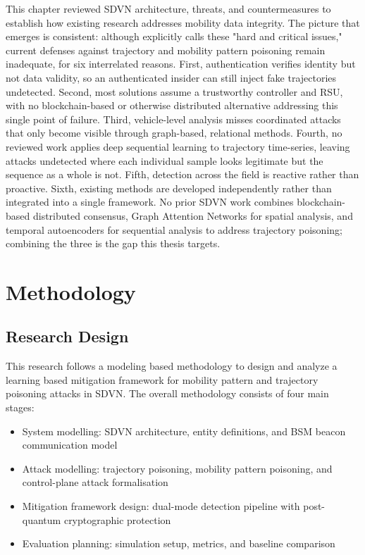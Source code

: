 \documentclass[12pt, a4paper]{report}
\begin{document}
This chapter reviewed SDVN architecture, threats, and countermeasures to establish how existing research addresses mobility data integrity. The picture that emerges is consistent: although \cite{arif2020} explicitly calls these "hard and critical issues," current defenses against trajectory and mobility pattern poisoning remain inadequate, for six interrelated reasons. First, authentication verifies identity but not data validity, so an authenticated insider can still inject fake trajectories undetected. Second, most solutions assume a trustworthy controller and RSU, with no blockchain-based or otherwise distributed alternative addressing this single point of failure. Third, vehicle-level analysis misses coordinated attacks that only become visible through graph-based, relational methods. Fourth, no reviewed work applies deep sequential learning to trajectory time-series, leaving attacks undetected where each individual sample looks legitimate but the sequence as a whole is not. Fifth, detection across the field is reactive rather than proactive. Sixth, existing methods are developed independently rather than integrated into a single framework. No prior SDVN work combines blockchain-based distributed consensus, Graph Attention Networks for spatial analysis, and temporal autoencoders for sequential analysis to address trajectory poisoning; combining the three is the gap this thesis targets.


\chapter{Methodology}

\section{Research Design}

This research follows a modeling based methodology to design and analyze a learning based mitigation framework for mobility pattern and trajectory poisoning attacks in SDVN. The overall methodology consists of four main stages:
\begin{itemize}
    \item System modelling: SDVN architecture, entity definitions,
          and BSM beacon communication model
    \item Attack modelling: trajectory poisoning, mobility pattern
          poisoning, and control-plane attack formalisation
    \item Mitigation framework design: dual-mode detection pipeline
          with post-quantum cryptographic protection
    \item Evaluation planning: simulation setup, metrics, and
          baseline comparison
\end{itemize}
\end{document}
